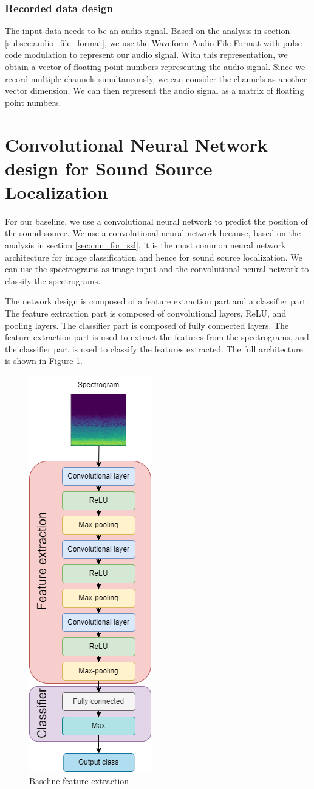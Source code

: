 \subsubsection{Recorded data design}

The input data needs to be an audio signal. Based on the analysis in section \ref{subsec:audio_file_format}, we use the Waveform Audio File Format with pulse-code modulation to represent our audio signal. With this representation, we obtain a vector of floating point numbers representing the audio signal. Since we record multiple channels simultaneously, we can consider the channels as another vector dimension. We can then represent the audio signal as a matrix of floating point numbers.

\section{Convolutional Neural Network design for Sound Source Localization}
\label{sec:cnn_design_for_ssl}

For our baseline, we use a convolutional neural network to predict the position of the sound source. We use a convolutional neural network because, based on the analysis in section \ref{sec:cnn_for_ssl}, it is the most common neural network architecture for image classification and hence for sound source localization. We can use the spectrograms as image input and the convolutional neural network to classify the spectrograms.

The network design is composed of a feature extraction part and a classifier part. The feature extraction part is composed of convolutional layers, ReLU, and pooling layers. The classifier part is composed of fully connected layers. The feature extraction part is used to extract the features from the spectrograms, and the classifier part is used to classify the features extracted. The full architecture is shown in Figure \ref{fig:baseline_feature_extraction}.

\begin{figure}[H]
    \centering
    \includegraphics[width=.25\textwidth]{../Images/cnn_architecture_design.drawio.png}
    \caption{Baseline feature extraction}
    \label{fig:baseline_feature_extraction}
\end{figure}

